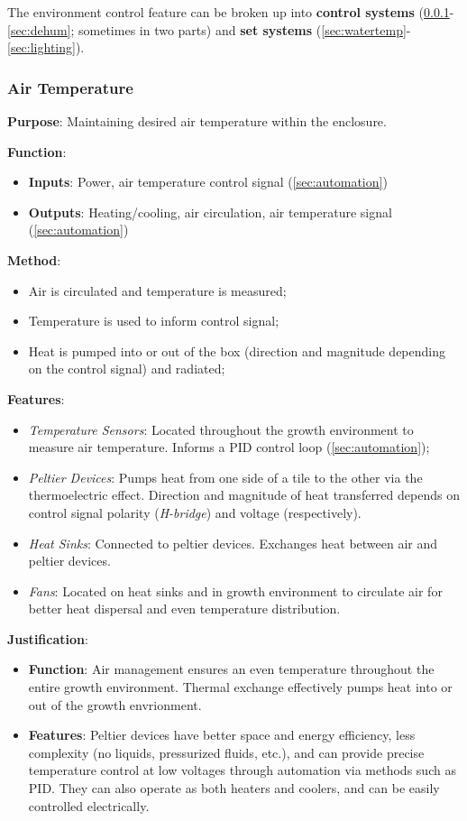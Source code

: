 \documentclass{report}
\begin{document}
The environment control feature can be broken up into \textbf{control systems} (\ref{sec:airtemp}-\ref{sec:dehum}; sometimes in two parts) and \textbf{set systems} (\ref{sec:watertemp}-\ref{sec:lighting}).

\subsubsection{Air Temperature}
\label{sec:airtemp}

\textbf{Purpose}: Maintaining desired air temperature within the enclosure.

\textbf{Function}:
\begin{itemize}
    \item \textbf{Inputs}: Power, air temperature control signal (\ref{sec:automation})
    \item \textbf{Outputs}: Heating/cooling, air circulation, air temperature signal (\ref{sec:automation})
\end{itemize}

\textbf{Method}:
\begin{itemize}
    \item Air is circulated and temperature is measured;
    \item Temperature is used to inform control signal;
    \item Heat is pumped into or out of the box (direction and magnitude depending on the control signal) and radiated;
\end{itemize}

\textbf{Features}:
\begin{itemize}
    \item \textit{Temperature Sensors}: Located throughout the growth environment to measure air temperature. Informs a PID control loop (\ref{sec:automation});
    \item \textit{Peltier Devices}: Pumps heat from one side of a tile to the other via the thermoelectric effect. Direction and magnitude of heat transferred depends on control signal polarity (\textit{H-bridge}) and voltage (respectively).
    \item \textit{Heat Sinks}: Connected to peltier devices. Exchanges heat between air and peltier devices.
    \item \textit{Fans}: Located on heat sinks and in growth environment to circulate air for better heat dispersal and even temperature distribution.
\end{itemize}

\textbf{Justification}: 
\begin{itemize}
    \item \textbf{Function}: Air management ensures an even temperature throughout the entire growth environment. Thermal exchange effectively pumps heat into or out of the growth envrionment.
    \item \textbf{Features}: Peltier devices have better space and energy efficiency, less complexity (no liquids, pressurized fluids, etc.), and can provide precise temperature control at low voltages through automation via methods such as PID. They can also operate as both heaters and coolers, and can be easily controlled electrically.
\end{itemize}
\end{document}
